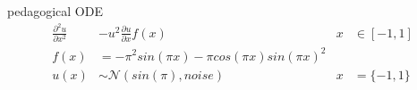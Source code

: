 \documentclass[aspectratio=169]{beamer}
\begin{document}
\begin{frame}{pedagogical ODE}
%  
$$
\begin{aligned}
\frac{\partial^2 u}{\partial x^2} &- u^2 \frac{\partial u}{\partial x}  f(x) & x&\in[-1,1]
\\
f(x) &= -\pi^2 sin(\pi x) - \pi cos(\pi x)sin(\pi x)^2
\\
u(x) & \sim \mathcal N(sin(\pi), noise)& x&=\{-1,1\}
\end{aligned}
$$
\end{frame}
\end{document}
